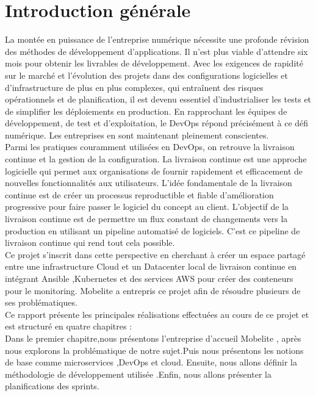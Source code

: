 \chapter*{\textbf{\selectfont{}\LARGE Introduction générale}}
\label{chap:introduction}
La montée en puissance de l'entreprise numérique nécessite une profonde révision des méthodes de développement d'applications. Il n'est plus viable d'attendre six mois pour obtenir les livrables de développement. Avec les exigences de rapidité sur le marché et l'évolution des projets dans des configurations logicielles et d'infrastructure de plus en plus complexes, qui entraînent des risques opérationnels et de planification, il est devenu essentiel d'industrialiser les tests et de simplifier les déploiements en production. En rapprochant les équipes de développement, de test et d'exploitation, le DevOps répond précisément à ce défi numérique. Les entreprises en sont maintenant pleinement conscientes.\\[0.3cm]
Parmi les pratiques couramment utilisées en DevOps, on retrouve la livraison continue et la gestion de la configuration. La livraison continue est une approche logicielle qui permet aux organisations de fournir rapidement et efficacement de nouvelles fonctionnalités aux utilisateurs. L'idée fondamentale de la livraison continue est de créer un processus reproductible et fiable d'amélioration progressive pour faire passer le logiciel du concept au client. L'objectif de la livraison continue est de permettre un flux constant de changements vers la production en utilisant un pipeline automatisé de logiciels. C'est ce pipeline de livraison continue qui rend tout cela possible.\\[0.3cm]
Ce projet s'inscrit dans cette perspective en cherchant à  créer un espace partagé entre une infrastructure Cloud et un Datacenter local de livraison continue en intégrant Ansible ,Kubernetes et des services AWS pour créer des conteneurs pour le monitoring. Mobelite a entrepris ce projet afin de résoudre plusieurs de ses problématiques.\\[0.3cm]
Ce rapport présente les principales réalisations effectuées au cours de ce projet et est structuré en quatre chapitres :\\[0.3cm]
Dans le premier chapitre,nous présentons l’entreprise d’accueil Mobelite , après nous explorons la problématique de notre sujet.Puis nous présentons les notions de base comme microservices ,DevOps et cloud. Ensuite, nous allons définir la méthodologie de développement utilisée .Enfin, nous allons présenter la planifications des sprints.\\[0.3cm]
